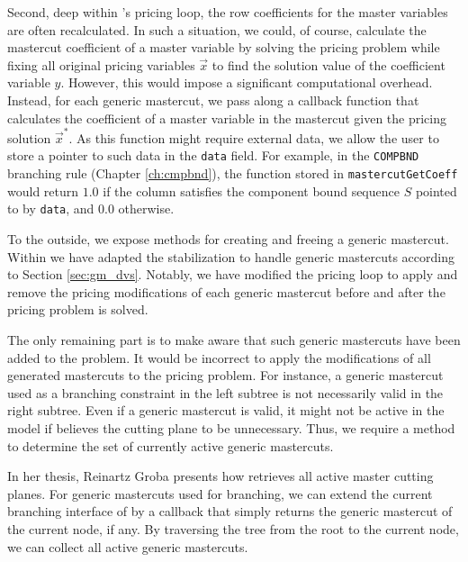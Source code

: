 Second, deep within \GCG{}'s pricing loop, the row coefficients for the master variables are often recalculated. In such a situation, we could, of course, calculate the mastercut coefficient of a master variable by solving the pricing problem while fixing all original pricing variables $\vec{x}$ to find the solution value of the coefficient variable $y$. However, this would impose a significant computational overhead. Instead, for each generic mastercut, we pass along a callback function that calculates the coefficient of a master variable in the mastercut given the pricing solution $\vec{x}^*$. As this function might require external data, we allow the user to store a pointer to such data in the \texttt{data} field. For example, in the \texttt{COMPBND} branching rule (Chapter \ref{ch:cmpbnd}), the function stored in \texttt{mastercutGetCoeff} would return $1.0$ if the column satisfies the component bound sequence $S$ pointed to by \texttt{data}, and $0.0$ otherwise.

To the outside, we expose methods for creating and freeing a generic mastercut. Within \GCG{} we have adapted the stabilization to handle generic mastercuts according to Section \ref{sec:gm_dvs}. Notably, we have modified the pricing loop to apply and remove the pricing modifications of each generic mastercut before and after the pricing problem is solved.

The only remaining part is to make \GCG{} aware that such generic mastercuts have been added to the problem. It would be incorrect to apply the modifications of all generated mastercuts to the pricing problem. For instance, a generic mastercut used as a branching constraint in the left subtree is not necessarily valid in the right subtree. Even if a generic mastercut is valid, it might not be active in the model if \SCIP{} believes the cutting plane to be unnecessary. Thus, we require a method to determine the set of currently active generic mastercuts.

In her thesis, Reinartz Groba \cite{reinartzgroba2024todo} presents how \GCG{} retrieves all active master cutting planes. For generic mastercuts used for branching, we can extend the current branching interface of \GCG{} by a callback that simply returns the generic mastercut of the current node, if any. By traversing the tree from the root to the current node, we can collect all active generic mastercuts.
